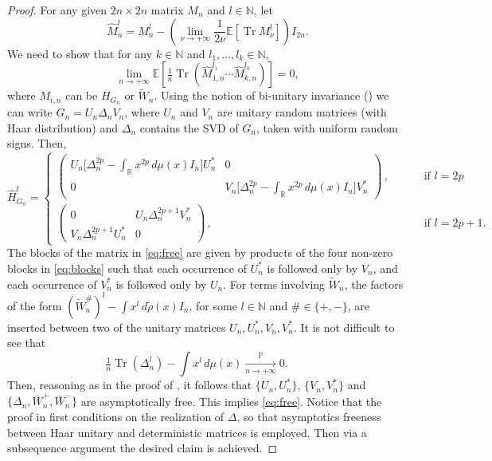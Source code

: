 \documentclass[11pt,oneside]{amsart}
\theoremstyle{plain}
\numberwithin{equation}{section}
\newcommand{\N}{\mathbb{N}}
\newcommand{\R}{\mathbb{R}}
\newcommand{\E}{\mathbb{E}}
\newcommand{\p}{\mathbb{P}}
\newcommand{\pconv}{\xrightarrow[\textit{n} \to +\infty]{\quad \p \quad}}
\DeclareMathOperator{\trace}{Tr}
\begin{document}
\begin{proof}
For any given $2n \times 2n$ matrix $M_n$ and $l \in \N$, let
$$\widehat M_n^l = M_n^{l}-\left(\lim_{\nu \to +\infty}\frac{1}{2\nu} \E \left[\trace M_\nu^{l}\right]\right)I_{2n}.$$
We need to show that for any $k \in \N$ and $l_1 ,\dots, l_k \in \N$,
\begin{equation} \label{eq:free}\lim_{n \to +\infty} \E \left[\tfrac 1n \trace \left(\widehat M_{1,n}^{l_1} \cdots \widehat M_{k,n}^{l_k}\right)\right]=0,\end{equation}
where $M_{i,n}$ can be $H_{G_n}$ or $\widetilde{W}_n$.
Using the notion of bi-unitary invariance (\cite[Theorem 3.2]{HP}) we can write $G_n = U_n \Delta_n V_n$, where $U_n$ and $V_n$ are unitary random matrices (with Haar distribution) and $\Delta_n$ contains the SVD of ${G_n}$, taken with uniform random signs. Then,
\begin{equation} \label{eq:blocks}
    \widehat H_{G_n}^l= \begin{cases}
    \begin{pmatrix}
        U_n \big[\Delta_n^{2p}-\int_{\R} x^{2p} \,d\mu(x) I_n\big]U^*_n&0\\
        0& V_n \big[\Delta_n^{2p}-\int_{\R} x^{2p} \,d\mu(x) I_n\big] V^*_n
    \end{pmatrix}\,, &\qquad \text{ if } l=2p\\
    \begin{pmatrix}
        0&  U_n \Delta_n^{2p+1} V^*_n\\V_n \Delta_n^{2p+1} U^*_n&0
    \end{pmatrix}\,, &\qquad \text{ if } l=2p+1.
    \end{cases}
\end{equation}
The blocks of the matrix in \eqref{eq:free} are given by products of the four non-zero blocks in \eqref{eq:blocks} such that each occurrence of $U_n^*$ is followed only by $V_n$, and each occurrence of $V_n^*$ is followed only by $U_n$.
For terms involving $\widetilde{W}_n$, the factors of the form ${(\widetilde{W}_n^\#)^l}-\int x^l \,d\tilde \rho(x) I_{n}$, for some $l \in \N$ and $\# \in\{+,-\}$, are inserted between two of the unitary matrices $U_n,U_n^*,V_n,V^*_n$. 
It is not difficult to see that
\begin{equation}
    \tfrac1n\trace {(\Delta_n^l)}-\int x^l \,d\mu(x) \pconv 0.
    \qquad
\end{equation}
Then, reasoning as in the proof of \cite[Proposition 5.8]{GKT}, it follows that $\{U_n, U^*_n\}$, $\{V_n, V_n^*\}$ and $\{\Delta_n,\bar{W}_n^+,\bar{W}_n^-\}$ are asymptotically free. This implies \eqref{eq:free}. Notice that the proof in \cite{GKT} first conditions on the realization of $\Delta$, so that asymptotics freeness between Haar unitary and deterministic matrices is employed. Then via a subsequence argument the desired claim is achieved.
\end{proof}
\end{document}
